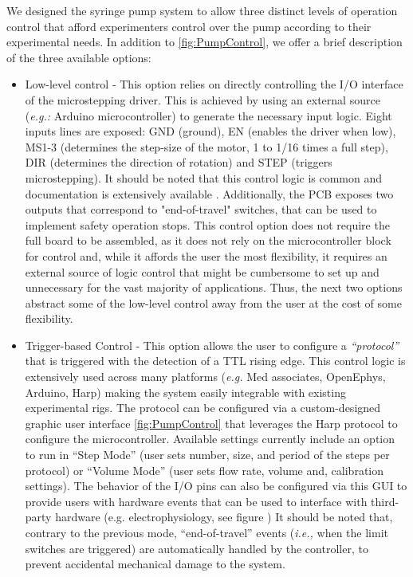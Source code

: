 We designed the syringe pump system to allow three distinct levels of operation control that afford experimenters control over the pump according to their experimental needs. In addition to \ref*{fig:PumpControl}, we offer a brief description of the three available options:
\begin{itemize}

\item{Low-level control} - This option relies on directly controlling the I/O interface of the microstepping driver. This is achieved by using an external source (\textit{e.g.:} Arduino microcontroller) to generate the necessary input logic. Eight inputs lines are exposed: GND (ground), EN (enables the driver when low), MS1-3 (determines the step-size of the motor, 1 to 1/16 times a full step), DIR (determines the direction of rotation) and STEP (triggers microstepping). It should be noted that this control logic is common and documentation is extensively available .
Additionally, the PCB exposes two outputs that correspond to "end-of-travel" switches, that can be used to implement safety operation stops.
This control option does not require the full board to be assembled, as it does not rely on the microcontroller block for control and, while it affords the user the most flexibility, it requires an external source of logic control that might be cumbersome to set up and unnecessary for the vast majority of applications. Thus, the next two options abstract some of the low-level control away from the user at the cost of some flexibility.

\item{Trigger-based Control} - This option allows the user to configure a \textit{“protocol”} that is triggered with the detection of a TTL rising edge. This control logic is extensively used across many platforms (\textit{e.g.} Med associates, OpenEphys, Arduino, Harp) making the system easily integrable with existing experimental rigs.
The protocol can be configured via a custom-designed graphic user interface \ref{fig:PumpControl} that leverages the Harp protocol to configure the microcontroller. Available settings currently include an option to run in “Step Mode” (user sets number, size, and period of the steps per protocol) or “Volume Mode” (user sets flow rate, volume and, calibration settings). The behavior of the I/O pins can also be configured via this GUI to provide users with hardware events that can be used to interface with third-party hardware (e.g. electrophysiology, see figure )
It should be noted that, contrary to the previous mode, “end-of-travel” events (\textit{i.e.,} when the limit switches are triggered) are automatically handled by the controller, to prevent accidental mechanical damage to the system.


\end{itemize}
